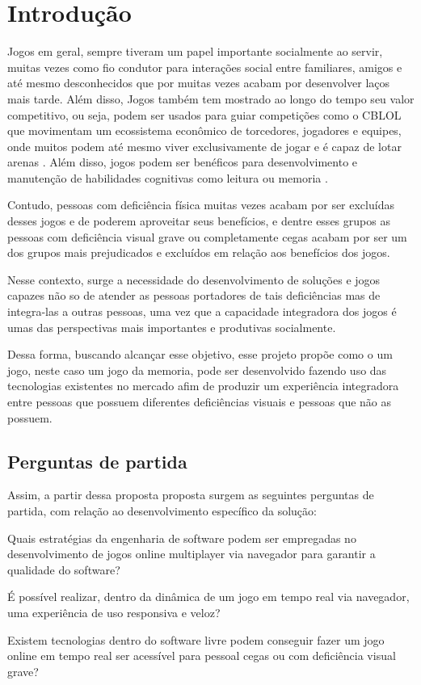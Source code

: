 \chapter{Introdução}
\label{cap:introducao}

Jogos em geral, sempre tiveram um papel importante socialmente ao servir, muitas vezes como fio condutor para interações social entre familiares, amigos e até mesmo desconhecidos que por muitas vezes acabam por desenvolver laços mais tarde. Além disso, Jogos também tem mostrado ao longo do tempo seu valor competitivo, ou seja, podem ser usados para guiar competições como o CBLOL que movimentam um ecossistema econômico de torcedores, jogadores e equipes, onde muitos podem até mesmo viver exclusivamente de jogar e é capaz de lotar arenas \cite{FinalCBL40:online}. Além disso, jogos podem ser benéficos para desenvolvimento e manutenção de habilidades cognitivas como leitura \cite{Enhancingreading} ou memoria \cite{videogameimproveshigh-fidelitymemory}.

Contudo, pessoas com deficiência física muitas vezes acabam por ser excluídas desses jogos e de poderem aproveitar seus benefícios, e dentre esses grupos as pessoas com deficiência visual grave ou completamente cegas acabam por ser um dos grupos mais prejudicados e excluídos em relação aos benefícios dos jogos.

Nesse contexto, surge a necessidade do desenvolvimento de soluções e jogos capazes não so de atender as pessoas portadores de tais deficiências mas de integra-las a outras pessoas, uma vez que a capacidade integradora dos jogos é umas das perspectivas mais importantes e produtivas socialmente. 

Dessa forma, buscando alcançar esse objetivo, esse projeto propõe como o um jogo, neste caso um jogo da memoria, pode ser desenvolvido fazendo uso das tecnologias existentes no mercado afim de produzir um experiência integradora entre pessoas que possuem diferentes deficiências visuais e pessoas que não as possuem. 

\section{Perguntas de partida}

Assim, a partir dessa proposta proposta surgem as seguintes perguntas de partida, com relação ao desenvolvimento específico da solução:

\begin{questao}
  \item Quais estratégias da engenharia de software podem ser empregadas no desenvolvimento de jogos online multiplayer via navegador para garantir a qualidade do software?
  \item É possível realizar, dentro da dinâmica de um jogo em tempo real via navegador, uma experiência de uso responsiva e veloz?
  \item Existem tecnologias dentro do software livre podem conseguir fazer um jogo online em tempo real ser acessível para pessoal cegas ou com deficiência visual grave?
\end{questao}

